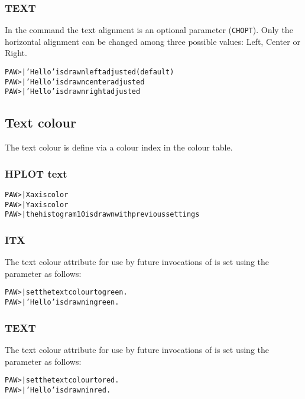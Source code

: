 \subsubsection{TEXT}
In the command  the text alignment is an optional parameter
(\texttt{CHOPT}). Only the horizontal alignment can be changed among three 
possible values: Left, Center or Right.
\begin{alltt}
PAW >  | 'Hello' is drawn left adjusted (default)
PAW >  | 'Hello' is drawn center adjusted
PAW >  | 'Hello' is drawn right adjusted
\end{alltt}

\subsection*{Text colour}
The text colour is define via a colour index in the colour table.
\subsubsection{HPLOT text}
\begin{alltt}
PAW >     | X axis color
PAW >     | Y axis color
PAW >  | the histogram 10 is drawn with previous settings
\end{alltt}
\subsubsection{ITX}
The text colour attribute for use by future invocations of 
 is set using the  parameter as follows:
\begin{alltt}
PAW >     | set the text colour to green.
PAW >  | 'Hello' is drawn in green.
\end{alltt}
\subsubsection{TEXT}
The text colour attribute for use by future invocations of 
 is set using the  parameter as follows:
\begin{alltt}
PAW >        | set the text colour to red.
PAW >  | 'Hello' is drawn in red.
\end{alltt}

